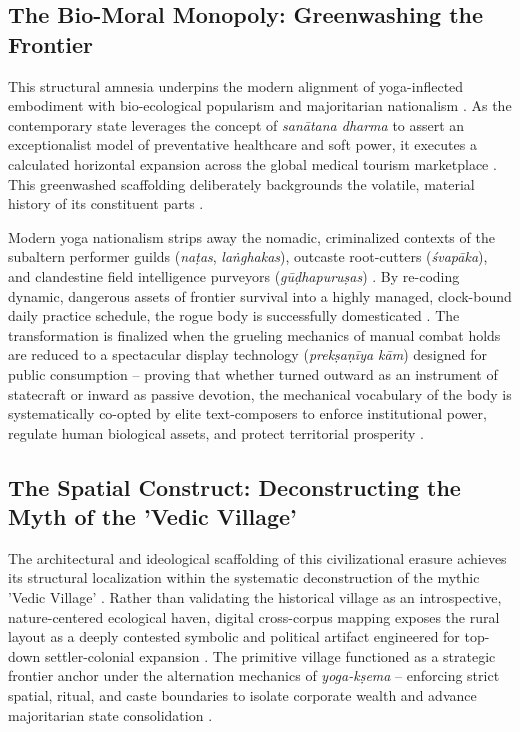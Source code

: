 \documentclass[11pt,twoside,letterpaper]{article}
\begin{document}
\subsection{The Bio-Moral Monopoly: Greenwashing the Frontier}
This structural amnesia underpins the modern alignment of yoga-inflected embodiment with bio-ecological popularism and majoritarian nationalism \citep{McCartney2021}. As the contemporary state leverages the concept of \textit{sanātana dharma} to assert an exceptionalist model of preventative healthcare and soft power, it executes a calculated horizontal expansion across the global medical tourism marketplace \citep{McCartney2021}. This greenwashed scaffolding deliberately backgrounds the volatile, material history of its constituent parts \citep{McCartney2021}.

Modern yoga nationalism strips away the nomadic, criminalized contexts of the subaltern performer guilds (\textit{naṭas}, \textit{laṅghakas}), outcaste root-cutters (\textit{śvapāka}), and clandestine field intelligence purveyors (\textit{gūḍhapuruṣas}) \citep{McCartney2021}. By re-coding dynamic, dangerous assets of frontier survival into a highly managed, clock-bound daily practice schedule, the rogue body is successfully domesticated \citep{McCartney2021}. The transformation is finalized when the grueling mechanics of manual combat holds are reduced to a spectacular display technology (\textit{prekṣaṇīya kām}) designed for public consumption – proving that whether turned outward as an instrument of statecraft or inward as passive devotion, the mechanical vocabulary of the body is systematically co-opted by elite text-composers to enforce institutional power, regulate human biological assets, and protect territorial prosperity \citep{McCartney2021}.

\subsection{The Spatial Construct: Deconstructing the Myth of the 'Vedic Village'}
The architectural and ideological scaffolding of this civilizational erasure achieves its structural localization within the systematic deconstruction of the mythic 'Vedic Village' \citep{McCartney2026}. Rather than validating the historical village as an introspective, nature-centered ecological haven, digital cross-corpus mapping exposes the rural layout as a deeply contested symbolic and political artifact engineered for top-down settler-colonial expansion \citep{McCartney2026}. The primitive village functioned as a strategic frontier anchor under the alternation mechanics of \textit{yoga-kṣema} – enforcing strict spatial, ritual, and caste boundaries to isolate corporate wealth and advance majoritarian state consolidation \citep{McCartney2026}.
\end{document}
